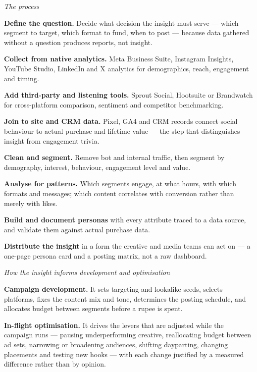 \begin{qlist}
\textit{The process}
\begin{apts}
\item \textbf{Define the question.} Decide what decision the insight must serve
      --- which segment to target, which format to fund, when to post --- because
      data gathered without a question produces reports, not insight.
\item \textbf{Collect from native analytics.} Meta Business Suite, Instagram
      Insights, YouTube Studio, LinkedIn and X analytics for demographics,
      reach, engagement and timing.
\item \textbf{Add third-party and listening tools.} Sprout Social, Hootsuite or
      Brandwatch for cross-platform comparison, sentiment and competitor
      benchmarking.
\item \textbf{Join to site and CRM data.} Pixel, GA4 and CRM records connect
      social behaviour to actual purchase and lifetime value --- the step that
      distinguishes insight from engagement trivia.
\item \textbf{Clean and segment.} Remove bot and internal traffic, then segment
      by demography, interest, behaviour, engagement level and value.
\item \textbf{Analyse for patterns.} Which segments engage, at what hours, with
      which formats and messages; which content correlates with conversion
      rather than merely with likes.
\item \textbf{Build and document personas} with every attribute traced to a
      data source, and validate them against actual purchase data.
\item \textbf{Distribute the insight} in a form the creative and media teams can
      act on --- a one-page persona card and a posting matrix, not a raw
      dashboard.
\end{apts}

\textit{How the insight informs development and optimisation}
\begin{apts}\setcounter{enumi}{8}
\item \textbf{Campaign development.} It sets targeting and lookalike seeds,
      selects platforms, fixes the content mix and tone, determines the posting
      schedule, and allocates budget between segments before a rupee is spent.
\item \textbf{In-flight optimisation.} It drives the levers that are adjusted
      while the campaign runs --- pausing underperforming creative, reallocating
      budget between ad sets, narrowing or broadening audiences, shifting
      dayparting, changing placements and testing new hooks --- with each change
      justified by a measured difference rather than by opinion.
\end{apts}


\end{qlist}
